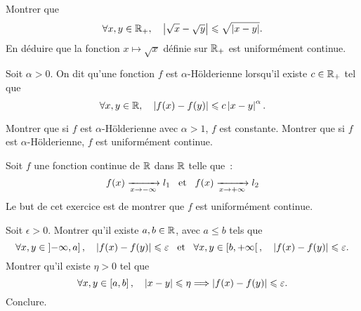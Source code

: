 \documentclass{magnolia}
\begin{document}
\begin{questions}
\question Montrer que
  \[\forall x,y\in\mathbb{R}_+ ,\quad \left|\sqrt{x}-\sqrt{y}\right|\leqslant\sqrt{\left|x-y\right|}.\]
\question En déduire que la fonction $x\mapsto \sqrt{x}$ définie sur $\mathbb{R}_+$
   est uniformément continue.
\end{questions}

Soit $\alpha>0$. On dit qu'une fonction $f$ est $\alpha$-Hölderienne lorsqu'il
existe $c\in\mathbb{R}_+$ tel que
\[\forall x,y\in\mathbb{R} ,\quad \left|f(x)-f(y)\right|\leqslant c\left|x-y\right|^{\alpha}.\]
\begin{questions}
\question Montrer que si $f$ est $\alpha$-Hölderienne avec $\alpha>1$, $f$ est
  constante.
\question Montrer que si $f$ est $\alpha$-Hölderienne, $f$ est uniformément
  continue.
\end{questions}


Soit $f$ une fonction continue de $\mathbb{R}$ dans $\mathbb{R}$ telle que~:
\[f(x) \xrightarrow[x\rightarrow -\infty]{} l_1 \quad\!\text{et}\quad\! f(x) \xrightarrow[x\rightarrow +\infty]{} l_2\]
Le but de cet exercice est de montrer que $f$ est uniformément continue.
\begin{questions}
\question Soit $\epsilon>0$. Montrer qu'il existe $a,b\in\mathbb{R}$, avec $a\leq b$
  tels que
  \[\forall x,y \in\left]-\infty,a\right] ,\quad \left|f(x)-f(y)\right|\leqslant\varepsilon
    \quad\!\text{et}\quad\!
    \forall x,y \in\left[b,+\infty\right[ ,\quad \left|f(x)-f(y)\right|\leqslant\varepsilon.\]
\question Montrer qu'il existe $\eta>0$ tel que
  \[\forall x,y\in\left[a,b\right] ,\quad \left|x-y\right|\leqslant\eta \Longrightarrow
    \left|f(x)-f(y)\right|\leqslant\varepsilon.\]
\question Conclure.
\end{questions}
\end{document}

